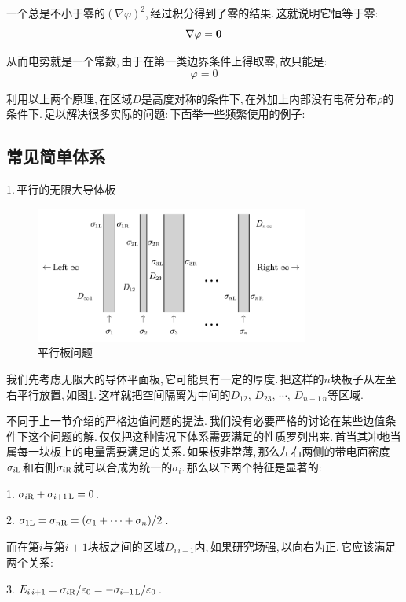 一个总是不小于零的$(\nabla\varphi)^2$,\,经过积分得到了零的结果.\,这就说明它恒等于零:
\[\nabla\varphi=\boldsymbol{0}\]

从而电势就是一个常数,\,由于在第一类边界条件上得取零,\,故只能是:
\[\varphi=0\]

\vspace{1cm}

利用以上两个原理,\,在区域$D$是高度对称的条件下,\,在外加上内部没有电荷分布$\rho$的条件下.\,足以解决很多实际的问题:\,下面举一些频繁使用的例子:

\subsection{常见简单体系}

1.\,平行的无限大导体板

\begin{figure}
\vspace{-0.2cm}
\centering
\includegraphics[width=9cm]{image/7-2-6.png}
\caption{平行板问题}\label{fig7-2-6}
\end{figure}
我们先考虑无限大的导体平面板,\,它可能具有一定的厚度.\,把这样的$n$块板子从左至右平行放置,\,如图\ref{fig7-2-6}.\,这样就把空间隔离为中间的$D_{12},\,D_{23},\,\cdots,\,D_{n-1\,n}$等区域.

不同于上一节介绍的严格边值问题的提法.\,我们没有必要严格的讨论在某些边值条件下这个问题的解.\,仅仅把这种情况下体系需要满足的性质罗列出来.\,首当其冲地当属每一块板上的电量需要满足的关系.\,如果板非常薄,\,那么左右两侧的带电面密度$\sigma_{i{\rm L}}$和右侧$\sigma_{i{\rm R}}$就可以合成为统一的$\sigma_i$.\,那么以下两个特征是显著的:

1.\,$\sigma_{i{\rm R}}+\sigma_{i+1\,{\rm L}}=0$.

2.\,$\sigma_{1{\rm L}}=\sigma_{n{\rm R}}=(\sigma_1+\cdots+\sigma_n)/2$.

而在第$i$与第$i+1$块板之间的区域$D_{i\,i+1}$内,\,如果研究场强,\,以向右为正.\,它应该满足两个关系:

3.\,$E_{i\,i+1}=\sigma_{i{\rm R}}/\varepsilon_0=-\sigma_{i+1\,{\rm L}}/\varepsilon_0$.

